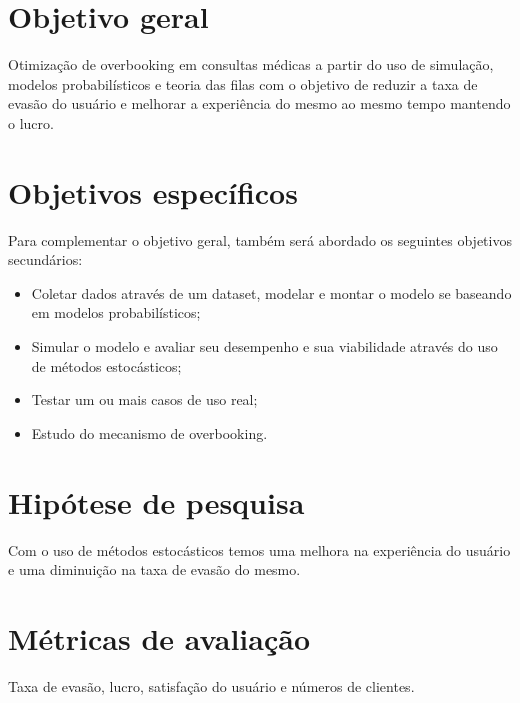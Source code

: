 \documentclass[
    12pt,                %
    openright,           %
    oneside,             %
    a4paper,             %
    english,             %
    brazil               %
]{abntex2}
\begin{document}

\section{Objetivo geral}

Otimização de overbooking em consultas médicas a partir do uso de simulação, modelos probabilísticos e teoria das filas com o objetivo de reduzir a taxa de evasão do usuário e melhorar a experiência do mesmo ao mesmo tempo mantendo o lucro.

\section{Objetivos específicos}

Para complementar o objetivo geral, também será abordado os seguintes objetivos secundários:
\begin{itemize}
    \item Coletar dados através de um dataset, modelar e montar o modelo se baseando em modelos probabilísticos;
    \item Simular o modelo e avaliar seu desempenho e sua viabilidade através do uso de métodos estocásticos;
    \item Testar um ou mais casos de uso real;
    \item Estudo do mecanismo de overbooking.
\end{itemize}

\section{Hipótese de pesquisa}

Com o uso de métodos estocásticos temos uma melhora na experiência do usuário e uma diminuição na taxa de evasão do mesmo.

\section{Métricas de avaliação}

Taxa de evasão, lucro, satisfação do usuário e números de clientes.

\postextual
\end{document}
